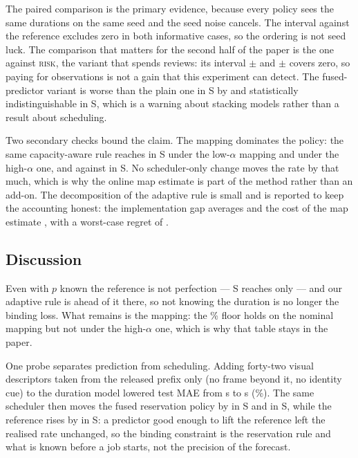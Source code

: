 \documentclass{swmcmthesis}
\begin{document}
The paired comparison is the primary evidence, because every policy sees the same
durations on the same seed and the seed noise cancels. The interval against the
reference excludes zero in both informative cases, so the ordering is not seed luck.
The comparison that matters for the second half of the paper is the one against
\textsc{risk}, the variant that spends reviews: its interval
\slotPStochPairSTwoRiskFusionDiff{}$\pm$\slotPStochPairSTwoRiskFusionCI{} and
\slotPStochPairSThreeRiskFusionDiff{}$\pm$\slotPStochPairSThreeRiskFusionCI{} covers
zero, so paying for observations is not a gain that this experiment can detect. The
fused-predictor variant is worse than the plain one in S\slotCaseTwo{} by
\slotPStochPairSTwoSlackFusionDiff{} and statistically indistinguishable in
S\slotCaseThree, which is a warning about stacking models rather than a result about
scheduling.

Two secondary checks bound the claim. The mapping dominates the policy: the same
capacity-aware rule reaches \slotPMapSThreeLowAlpha{} in S\slotCaseThree{} under the
low-$\alpha$ mapping and \slotPMapSThreeHighAlpha{} under the high-$\alpha$ one, and
\slotPMapSTwoLowAlpha{} against \slotPMapSTwoHighAlpha{} in S\slotCaseTwo. No
scheduler-only change moves the rate by that much, which is why the online map
estimate is part of the method rather than an add-on. The decomposition of the
adaptive rule is small and is reported to keep the accounting honest: the
implementation gap averages \slotPAdaptImplGapMean{} and the cost of the map estimate
\slotPAdaptAlphaCostMean{}, with a worst-case regret of \slotPAdaptRegretMax.

\subsection{Discussion}
\label{sec:p3disc}

Even with $p$ known the reference is not perfection --- S\slotCaseThree{} reaches only
\slotPStochSThreeOracleETA{} --- and our adaptive rule is ahead of it there, so not
knowing the duration is no longer the binding loss. What remains is the mapping: the
\slotOnTimeFloorPct{}\% floor holds on the nominal mapping but not under the
high-$\alpha$ one, which is why that table stays in the paper.

One probe separates prediction from scheduling. Adding forty-two visual descriptors
taken from the released prefix only (no frame beyond it, no identity cue) to the
duration model lowered test MAE from \slotPVisDurBase{} s to \slotPVisDurSel{} s
(\slotPVisDurRel{}\%). The same scheduler then moves the fused reservation policy by
\slotPVisSchedSTwoD{} in S\slotCaseTwo{} and \slotPVisSchedSThreeD{} in S\slotCaseThree{},
while the reference rises by \slotPVisOracleSThreeD{} in S\slotCaseThree{}: a predictor
good enough to lift the reference left the realised rate unchanged, so the binding
constraint is the reservation rule and what is known before a job starts, not the
precision of the forecast.
\end{document}
